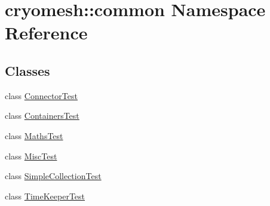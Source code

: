 \hypertarget{namespacecryomesh_1_1common}{
\section{cryomesh::common Namespace Reference}
\label{namespacecryomesh_1_1common}
}
\subsection*{Classes}
\begin{DoxyCompactItemize}
\item 
class \hyperlink{classcryomesh_1_1common_1_1_connector_test}{ConnectorTest}
\item 
class \hyperlink{classcryomesh_1_1common_1_1_containers_test}{ContainersTest}
\item 
class \hyperlink{classcryomesh_1_1common_1_1_maths_test}{MathsTest}
\item 
class \hyperlink{classcryomesh_1_1common_1_1_misc_test}{MiscTest}
\item 
class \hyperlink{classcryomesh_1_1common_1_1_simple_collection_test}{SimpleCollectionTest}
\item 
class \hyperlink{classcryomesh_1_1common_1_1_time_keeper_test}{TimeKeeperTest}
\end{DoxyCompactItemize}
